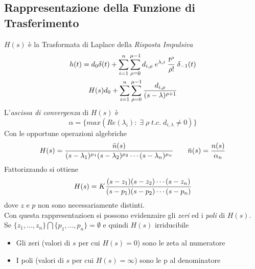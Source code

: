 \documentclass{article}
\begin{document}
		\subsection{Rappresentazione della Funzione di Trasferimento}
			$ H(s) $ è la Trasformata di Laplace della \textit{Risposta Impulsiva}
			\[
				\begin{gathered}
					h(t) = d_0 \delta(t) + \sum_{i=1}^{n} {\sum_{\rho=0}^{\mu-1} {d_{i,\rho}\; e^{\lambda, i}\; {{t^\rho}\over{\rho!}}\; \delta_{-1}(t)}} \\
					H(s) d_0 + \sum_{i=1}^{n} {\sum_{\rho=0}^{\mu-1} {{d_{i,\rho}}\over{(s-\lambda)^{\rho + 1}}}}
				\end{gathered}
			\]
			L'\textit{ascissa di convergenza} di $ H(s) $ è
			\[
				\alpha = \{ max(Re(\lambda_i):\; \exists\; \rho\; t.c.\; d_{i,\lambda} \neq 0) \}
			\]
			Con le opportune operazioni algebriche
			\[
				H(s) = {{\bar{n}(s)}\over{(s-\lambda_1)^{\mu_1}(s-\lambda_2)^{\mu_2} \cdots (s-\lambda_n)^{\mu_n}}} \quad\quad \bar{n}(s) = {{n(s)}\over{\alpha_n}}
			\]
			Fattorizzando si ottiene
			\[
				H(s) = K{{(s-z_1)(s-z_2) \cdots (s-z_n)}\over{(s-p_1)(s-p_2) \cdots (s-p_n)}}
			\]
			dove $ z \text{ e } p $ non sono necessariamente distinti. \\
			Con questa rappresentazioen si possono evidenzaire gli \textit{zeri} ed i \textit{poli} di $ H(s) $. \\
			Se $ \{ z_1, ..., z_n \} \bigcap \{ p_1, ..., p_n \} = \emptyset $ e quindi $ H(s) $ irriducibile
			\begin{itemize}
				\item Gli zeri (valori di $ s $ per cui $ H(s) = 0 $) sono le zeta al numeratore
				\item I poli (valori di $ s $ per cui $ H(s) = \infty $) sono le p al denominatore
			\end{itemize}
\end{document}
